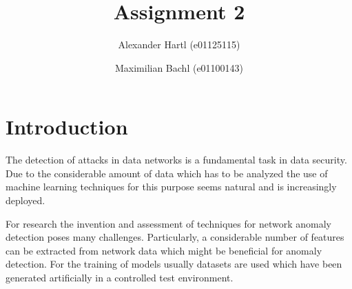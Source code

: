 \documentclass[sigconf,nonacm]{acmart}
\begin{document}
\title{Assignment 2}

\author{Alexander Hartl (e01125115)}

\author{Maximilian Bachl (e01100143)}
\authornotemark[1]

\renewcommand{\shortauthors}{Hartl and Bachl}


\maketitle

\section{Introduction}
The detection of attacks in data networks is a fundamental task in data security. Due to the considerable amount of data which has to be analyzed the use of machine learning techniques for this purpose seems natural and is increasingly deployed.

For research the invention and assessment of techniques for network anomaly detection poses many challenges. Particularly, a considerable number of features can be extracted from network data which might be beneficial for anomaly detection. For the training of models usually datasets are used which have been generated artificially in a controlled test environment. 
\end{document}
